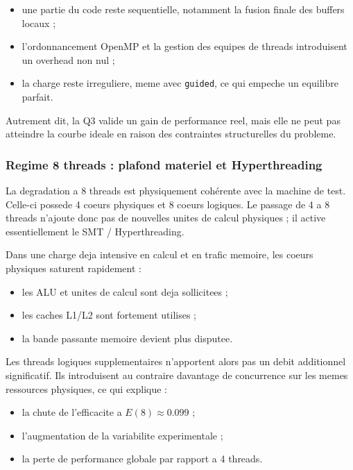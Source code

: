 \documentclass[11pt,a4paper]{article}
\begin{document}
\begin{itemize}[leftmargin=1.2em]
  \item une partie du code reste sequentielle, notamment la fusion finale des buffers locaux ;
  \item l'ordonnancement OpenMP et la gestion des equipes de threads introduisent un overhead non nul ;
  \item la charge reste irreguliere, meme avec \texttt{guided}, ce qui empeche un equilibre parfait.
\end{itemize}

Autrement dit, la Q3 valide un gain de performance reel, mais elle ne peut pas atteindre la courbe ideale en raison des contraintes structurelles du probleme.

\subsubsection{Regime 8 threads : plafond materiel et Hyperthreading}

La degradation a 8 threads est physiquement cohérente avec la machine de test. Celle-ci possede 4 coeurs physiques et 8 coeurs logiques. Le passage de 4 a 8 threads n'ajoute donc pas de nouvelles unites de calcul physiques ; il active essentiellement le SMT / Hyperthreading.

Dans une charge deja intensive en calcul et en trafic memoire, les coeurs physiques saturent rapidement :

\begin{itemize}[leftmargin=1.2em]
  \item les ALU et unites de calcul sont deja sollicitees ;
  \item les caches L1/L2 sont fortement utilises ;
  \item la bande passante memoire devient plus disputee.
\end{itemize}

Les threads logiques supplementaires n'apportent alors pas un debit additionnel significatif. Ils introduisent au contraire davantage de concurrence sur les memes ressources physiques, ce qui explique :

\begin{itemize}[leftmargin=1.2em]
  \item la chute de l'efficacite a \(E(8) \approx 0.099\) ;
  \item l'augmentation de la variabilite experimentale ;
  \item la perte de performance globale par rapport a 4 threads.
\end{itemize}
\end{document}
